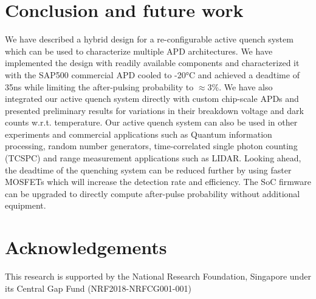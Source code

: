 \section{Conclusion and future work}
We have described a hybrid design for a re-configurable active quench system which can be used to characterize multiple APD architectures. We have implemented the design with readily available components and characterized it with the SAP500 commercial APD cooled to -20°C and achieved a deadtime of 35ns while limiting the after-pulsing probability to $\approx$3\%. We have also integrated our active quench system directly with custom chip-scale APDs and presented preliminary results for variations in their breakdown voltage and dark counts w.r.t. temperature. Our active quench system can also be used in other experiments and commercial applications such as Quantum information processing, random number generators, time-correlated single photon counting (TCSPC) and range measurement applications such as LIDAR. Looking ahead, the deadtime of the quenching system can be reduced further by using faster MOSFETs which will increase the detection rate and efficiency. The SoC firmware can be upgraded to directly compute after-pulse probability without additional equipment. 

\section{Acknowledgements}
This research is supported by the National Research Foundation, Singapore under its Central Gap Fund (NRF2018-NRFCG001-001)